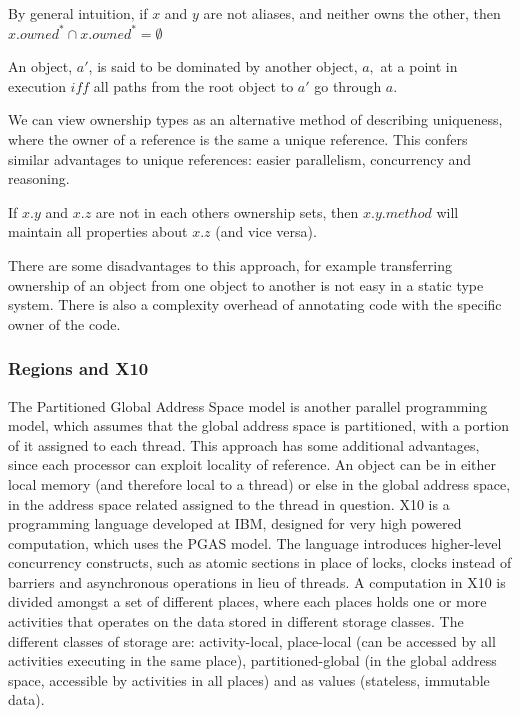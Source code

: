 \documentclass[pdftex,12pt,a4paper]{article}
\begin{document}
By general intuition, if $x$ and $y$ are not aliases, and neither owns the other, then $x.owned^{*} \cap x.owned^{*} = \emptyset$

An object, $a'$, is said to be dominated by another object, $a,$ at a point in execution $iff$ all paths from the root object to $a'$ go through $a$.

We can view ownership types as an alternative method of describing uniqueness, where the owner of a reference is the same a unique reference.
This confers similar advantages to unique references: easier parallelism, concurrency and reasoning.

If $x.y$ and $x.z$ are not in each others ownership sets, then $x.y.method$ will maintain
all properties about $x.z$ (and vice versa).

There are some disadvantages to this approach, for example transferring ownership of an object from one object to another is not easy in a static type system\cite{clarke1998}.
There is also a complexity overhead of annotating code with the specific owner of the code.

\subsubsection{Regions and X10}

The Partitioned Global Address Space model\cite{pgas} is another parallel programming model, which assumes that the global address space is partitioned, with a portion of it assigned to each thread.
This approach has some additional advantages, since each processor can exploit locality of reference.
An object can be in either local memory (and therefore local to a thread) or else in the global address space, in the address space related assigned to the thread in question.
X10 is a programming language developed at IBM, designed for very high powered computation, which uses the PGAS model.
The language introduces higher-level concurrency constructs, such as atomic sections in place of locks, clocks instead of barriers and asynchronous operations in lieu of threads\cite{x10}.
A computation in X10 is divided amongst a set of different places, where each places holds one or more activities that operates on the data stored in different storage classes.
The different classes of storage are: activity-local, place-local (can be accessed by all activities executing in the same place), partitioned-global (in the global address space, accessible by activities in all places) and as values (stateless, immutable data)\cite{x10-places}.
\end{document}
